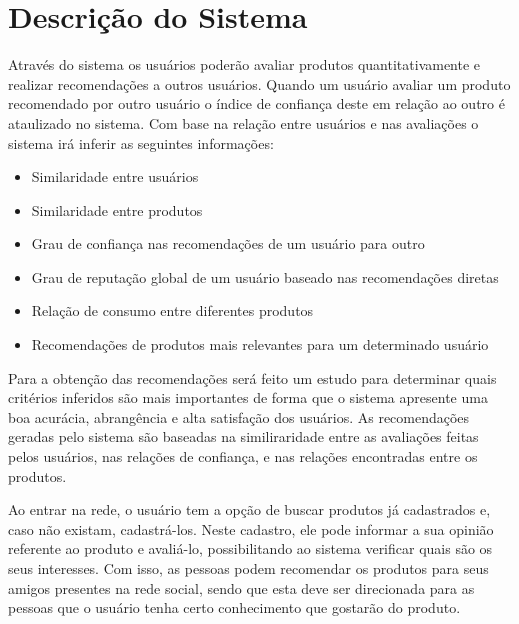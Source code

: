 
\section{Descrição do Sistema}


 Através do sistema os usuários poderão avaliar produtos quantitativamente e realizar recomendações a outros usuários. Quando um usuário avaliar um produto recomendado por outro usuário o índice de confiança deste em relação ao outro é ataulizado no sistema. Com base na relação entre usuários e nas avaliações o sistema irá inferir as seguintes informações:
 
\begin{itemize}

 \item Similaridade entre usuários

 \item Similaridade entre produtos

 \item Grau de confiança nas recomendações de um usuário para outro

 \item Grau de reputação global de um usuário baseado nas recomendações diretas

 \item Relação de consumo entre diferentes produtos

 \item Recomendações de produtos mais relevantes para um determinado usuário

\end{itemize}

 Para a obtenção das recomendações será feito um estudo para determinar quais critérios inferidos são mais importantes de forma que o sistema apresente uma boa acurácia, abrangência e alta satisfação dos usuários. As recomendações geradas pelo sistema são baseadas na similiraridade entre as avaliações feitas pelos usuários, nas relações de confiança, e nas relações encontradas entre os produtos.


 Ao entrar na rede, o usuário tem a opção de buscar produtos já cadastrados e, caso não existam, cadastrá-los. Neste cadastro, ele pode informar a sua opinião referente ao produto e avaliá-lo, possibilitando ao sistema verificar quais são os seus interesses. Com isso, as pessoas podem recomendar os produtos para seus amigos presentes na rede social, sendo que esta deve ser direcionada para as pessoas que o usuário tenha certo conhecimento que gostarão do produto.

